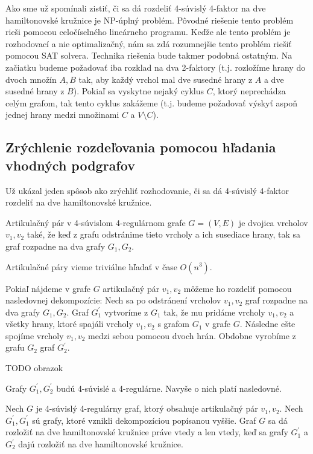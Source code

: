 Ako sme už spomínali zistiť, či sa dá rozdeliť 4-súvislý 4-faktor na dve hamiltonovské kružnice
je NP-úplný problém. Pôvodné riešenie tento problém rieši pomocou celočíselného lineárneho programu.
Keďže ale tento problém je rozhodovací a nie optimalizačný, nám sa zdá rozumnejšie tento 
problém riešiť pomocou SAT solvera. Technika riešenia bude takmer podobná ostatným.
Na začiatku budeme požadovať iba rozklad na dva 2-faktory (t.j. rozložíme hrany do dvoch množín $A,
B$ tak, aby každý vrchol mal dve susedné hrany z $A$ a dve susedné hrany z $B$). Pokiaľ sa vyskytne
nejaký cyklus $C$, ktorý neprechádza celým grafom, tak tento cyklus zakážeme (t.j. budeme požadovať
výskyť aspoň jednej hrany medzi množinami $C$ a $V \setminus C$). 

\subsection{Zrýchlenie rozdeľovania pomocou hľadania vhodných podgrafov}

Už \cite{duchenne} ukázal jeden spôsob ako zrýchliť rozhodovanie, či sa dá 4-súvislý 4-faktor
rozdeliť na dve hamiltonovské kružnice.

\begin{definicia}
Artikulačný pár v 4-súvislom 4-regulárnom grafe $G = (V, E)$ 
je dvojica vrcholov $v_1, v_2$ také, že keď z grafu odstránime
tieto vrcholy a ich susediace hrany, tak sa graf rozpadne na dva grafy
$G_1, G_2$.
\end{definicia}

Artikulačné páry vieme triviálne hľadať v čase $O(n^3)$.

Pokiaľ nájdeme v grafe $G$ artikulačný pár $v_1, v_2$ môžeme ho rozdeliť pomocou nasledovnej
dekompozície:
Nech sa po odstránení vrcholov $v_1, v_2$ graf rozpadne na dva grafy $G_1, G_2$.
Graf $G_1^{'}$ vytvoríme z $G_1$ tak, že mu pridáme vrcholy $v_1, v_2$ a všetky hrany, ktoré spajáli
vrcholy $v_1, v_2$ s grafom $G_1$ v grafe $G$. Následne ešte spojíme vrcholy $v_1, v_2$ medzi sebou
pomocou dvoch hrán. Obdobne vyrobíme z grafu $G_2$ graf $G_2^{'}$.

TODO obrazok

Grafy $G_1^{'}, G_2^{'}$ budú 4-súvislé a 4-regulárne. Navyše o nich platí nasledovné.

\begin{veta}
Nech $G$ je 4-súvislý 4-regulárny graf, ktorý obsahuje artikulačný pár $v_1, v_2$.
Nech $G_1^{'}, G_1^{'}$ sú grafy, ktoré vznikli dekompozíciou popísanou vyššie.
Graf $G$ sa dá rozložiť na dve hamiltonovské kružnice práve vtedy a len vtedy, keď
sa grafy $G_1^{'}$ a $G_2^{'}$ dajú rozložiť na dve hamiltonovské kružnice.
\end{veta}

